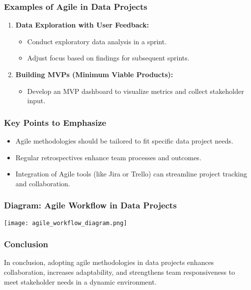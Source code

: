\documentclass[aspectratio=169]{beamer}
\begin{document}
\begin{frame}[fragile]
    \frametitle{Examples of Agile in Data Projects}
    \begin{enumerate}
        \item \textbf{Data Exploration with User Feedback:}
        \begin{itemize}
            \item Conduct exploratory data analysis in a sprint.
            \item Adjust focus based on findings for subsequent sprints.
        \end{itemize}
        
        \item \textbf{Building MVPs (Minimum Viable Products):}
        \begin{itemize}
            \item Develop an MVP dashboard to visualize metrics and collect stakeholder input.
        \end{itemize}
    \end{enumerate}
\end{frame}

\begin{frame}[fragile]
    \frametitle{Key Points to Emphasize}
    \begin{itemize}
        \item Agile methodologies should be tailored to fit specific data project needs.
        \item Regular retrospectives enhance team processes and outcomes.
        \item Integration of Agile tools (like Jira or Trello) can streamline project tracking and collaboration.
    \end{itemize}
\end{frame}

\begin{frame}[fragile]
    \frametitle{Diagram: Agile Workflow in Data Projects}
    \begin{center}
    \texttt{[image: agile\_workflow\_diagram.png]} %
    \end{center}
\end{frame}

\begin{frame}[fragile]
    \frametitle{Conclusion}
    In conclusion, adopting agile methodologies in data projects enhances 
    collaboration, increases adaptability, and strengthens team responsiveness 
    to meet stakeholder needs in a dynamic environment.
\end{frame}
\end{document}
